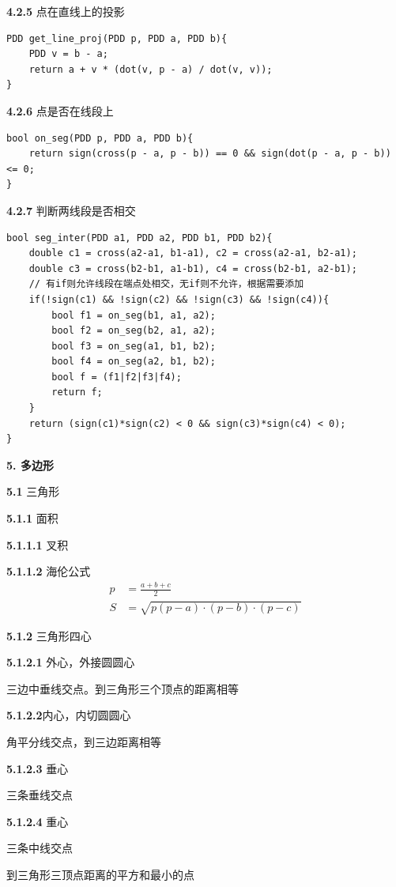 \documentclass[12pt]{article}
\begin{document}
\textbf{4.2.5} 点在直线上的投影

\begin{lstlisting}[style=C++]
PDD get_line_proj(PDD p, PDD a, PDD b){
	PDD v = b - a;
	return a + v * (dot(v, p - a) / dot(v, v));
}
\end{lstlisting}

\textbf{4.2.6} 点是否在线段上

\begin{lstlisting}[style=C++]
bool on_seg(PDD p, PDD a, PDD b){
	return sign(cross(p - a, p - b)) == 0 && sign(dot(p - a, p - b)) <= 0;
}
\end{lstlisting}

\textbf{4.2.7} 判断两线段是否相交

\begin{lstlisting}[style=C++]
bool seg_inter(PDD a1, PDD a2, PDD b1, PDD b2){
	double c1 = cross(a2-a1, b1-a1), c2 = cross(a2-a1, b2-a1);
	double c3 = cross(b2-b1, a1-b1), c4 = cross(b2-b1, a2-b1);
	// 有if则允许线段在端点处相交，无if则不允许，根据需要添加
	if(!sign(c1) && !sign(c2) && !sign(c3) && !sign(c4)){
		bool f1 = on_seg(b1, a1, a2);
		bool f2 = on_seg(b2, a1, a2);
		bool f3 = on_seg(a1, b1, b2);
		bool f4 = on_seg(a2, b1, b2);
		bool f = (f1|f2|f3|f4);
		return f;
	}
	return (sign(c1)*sign(c2) < 0 && sign(c3)*sign(c4) < 0);
}
\end{lstlisting}

\textbf{5. 多边形}

\textbf{5.1} 三角形

\textbf{5.1.1} 面积

\textbf{5.1.1.1} 叉积

\textbf{5.1.1.2} 海伦公式
$$
\begin{aligned}
	p &= \frac{a + b + c}{2}\\
	S &= \sqrt{p(p - a)\cdot(p - b)\cdot(p - c)}
\end{aligned}
$$

\textbf{5.1.2} 三角形四心

\textbf{5.1.2.1} 外心，外接圆圆心

三边中垂线交点。到三角形三个顶点的距离相等

\textbf{5.1.2.2}内心，内切圆圆心

角平分线交点，到三边距离相等

\textbf{5.1.2.3} 垂心

三条垂线交点

\textbf{5.1.2.4} 重心

三条中线交点

到三角形三顶点距离的平方和最小的点
\end{document}
